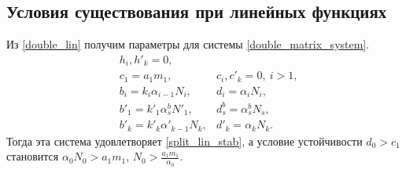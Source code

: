 \subsection{Условия существования при линейных функциях}
Из \eqref{double_lin} получим параметры для системы \eqref{double_matrix_system}.
\begin{equation}
    \begin{split}
        & h_i, h'_k = 0, \\
        & c_1 = a_1 m_1, & c_i, c'_k = 0, ~ i>1,  \\
        & b_i = k_i \alpha_{i-1} N_{i}, & d_i = \alpha_i N_{i}, \\
        & b'_1 = k'_1 \alpha^b_s N'_1, & d^b_s = \alpha^b_s N_s, \\
        & b'_k = k'_k \alpha'_{k-1} N_{k}, & d'_k = \alpha_k N_{k}.
    \end{split}
\end{equation}
Тогда эта система удовлетворяет \eqref{split_lin_stab}, а условие устойчивости \(d_0 > c_1\) становится \(\alpha_0 N_{0} > a_1 m_1\), \( N_0 > \frac{a_1 m_1}{\alpha_0}\).

